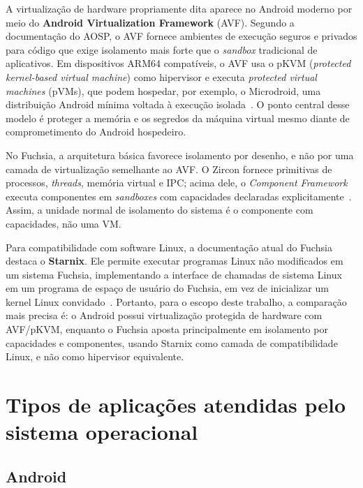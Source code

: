 \documentclass[12pt,a4paper]{article}
\begin{document}
A virtualização de hardware propriamente dita aparece no Android moderno por meio
do \textbf{Android Virtualization Framework} (AVF). Segundo a documentação do
AOSP, o AVF fornece ambientes de execução seguros e privados para código que
exige isolamento mais forte que o \emph{sandbox} tradicional de aplicativos. Em
dispositivos ARM64 compatíveis, o AVF usa o pKVM (\emph{protected kernel-based
virtual machine}) como hipervisor e executa \emph{protected virtual machines}
(pVMs), que podem hospedar, por exemplo, o Microdroid, uma distribuição Android
mínima voltada à execução isolada~\cite{androidavf}. O ponto central desse modelo
é proteger a memória e os segredos da máquina virtual mesmo diante de comprometimento
do Android hospedeiro.

No Fuchsia, a arquitetura básica favorece isolamento por desenho, e não por uma
camada de virtualização semelhante ao AVF. O Zircon fornece primitivas de
processos, \emph{threads}, memória virtual e IPC; acima dele, o \emph{Component
Framework} executa componentes em \emph{sandboxes} com capacidades declaradas
explicitamente~\cite{zircon,fuchsia_components,fuchsia_secure}. Assim, a unidade
normal de isolamento do sistema é o componente com capacidades, não uma VM.

Para compatibilidade com software Linux, a documentação atual do Fuchsia destaca
o \textbf{Starnix}. Ele permite executar programas Linux não modificados em um
sistema Fuchsia, implementando a interface de chamadas de sistema Linux em um
programa de espaço de usuário do Fuchsia, em vez de inicializar um kernel Linux
convidado~\cite{starnix,starnixkernel}. Portanto, para o escopo deste trabalho, a
comparação mais precisa é: o Android possui virtualização protegida de hardware
com AVF/pKVM, enquanto o Fuchsia aposta principalmente em isolamento por
capacidades e componentes, usando Starnix como camada de compatibilidade Linux, e
não como hipervisor equivalente.


\section{Tipos de aplicações atendidas pelo sistema operacional}
\label{sec:tipos_aplicacoes}

\subsection{Android}
\end{document}
